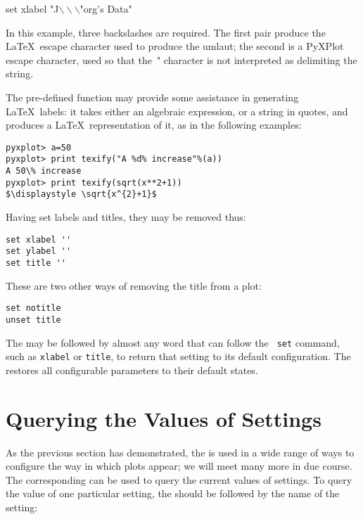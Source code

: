 \begin{dodo}
set xlabel "J$\backslash\backslash\backslash$"org's Data"
\end{dodo}

\noindent In this example, three backslashes are required. The first pair
produce the \LaTeX\ escape character used to produce the umlaut; the second is
a PyXPlot escape character, used so that the~" character is not interpreted as
delimiting the string. 

The pre-defined  function may provide some assistance in
generating \LaTeX\ labels: it takes either an algebraic expression, or a string
in quotes, and produces a \LaTeX\ representation of it, as in the following
examples:

\begin{verbatim}
pyxplot> a=50
pyxplot> print texify("A %d% increase"%(a))
A 50\% increase
pyxplot> print texify(sqrt(x**2+1))
$\displaystyle \sqrt{x^{2}+1}$
\end{verbatim}

Having set labels and titles, they may be removed thus:

\begin{verbatim}
set xlabel ''
set ylabel ''
set title ''
\end{verbatim}

\noindent These are two other ways of removing the title from a plot:

\begin{verbatim}
set notitle
unset title
\end{verbatim}

The  may be followed by almost any word that can follow the {\tt
set} command, such as {\tt xlabel} or {\tt title}, to return that setting to
its default configuration. The  restores all configurable
parameters to their default states.

\section{Querying the Values of Settings}

As the previous section has demonstrated, the  is used in a wide
range of ways to configure the way in which plots appear; we will meet many
more in due course. The corresponding  can be used to query the
current values of settings. To query the value of one particular setting, the
 should be followed by the name of the setting:

